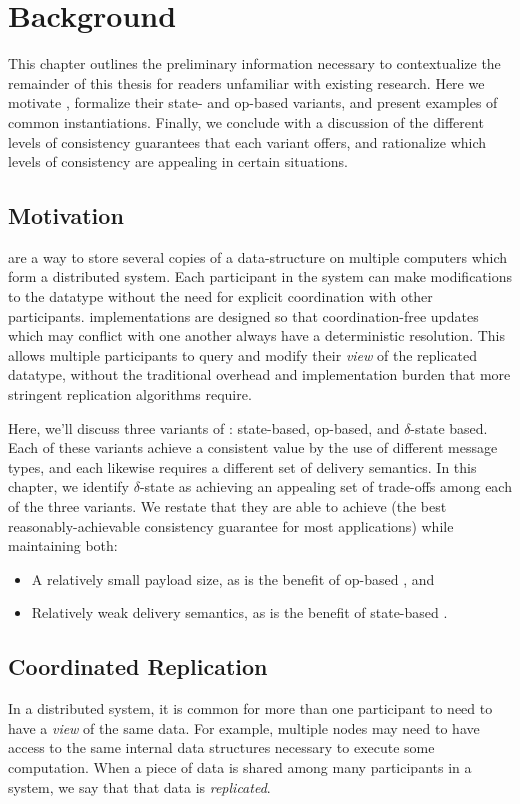 \chapter{Background}
\label{chap:background}

This chapter outlines the preliminary information necessary to contextualize the
remainder of this thesis for readers unfamiliar with existing \CRDT research.
Here we motivate \CRDTs, formalize their state- and op-based variants, and
present examples of common instantiations. Finally, we conclude with a
discussion of the different levels of consistency guarantees that each \CRDT
variant offers, and rationalize which levels of consistency are appealing in
certain situations.

\section{Motivation}
\CRDTs are a way to store several copies of a data-structure on multiple
computers which form a distributed system. Each participant in the system can
make modifications to the datatype without the need for explicit coordination
with other participants. \CRDT implementations are designed so that
coordination-free updates which may conflict with one another always have a
deterministic resolution. This allows multiple participants to query and modify
their \emph{view} of the replicated datatype, without the traditional overhead
and implementation burden that more stringent replication algorithms require.

Here, we'll discuss three variants of \CRDTs: state-based, op-based, and
$\delta$-state based. Each of these variants achieve a consistent value by the
use of different message types, and each likewise requires a different set of
delivery semantics. In this chapter, we identify $\delta$-state \CRDTs as
achieving an appealing set of trade-offs among each of the three variants. We
restate that they are able to achieve \SEC (the best reasonably-achievable
consistency guarantee for most \CRDT applications) while maintaining both:
\begin{itemize}
  \item A relatively small payload size, as is the benefit of op-based \CRDTs,
    and
  \item Relatively weak delivery semantics, as is the benefit of state-based
    \CRDTs.
\end{itemize}

\section{Coordinated Replication}
In a distributed system, it is common for more than one participant to need to
have a \textit{view} of the same data. For example, multiple nodes may need to
have access to the same internal data structures necessary to execute some
computation. When a piece of data is shared among many participants in a system,
we say that that data is \textit{replicated}.

